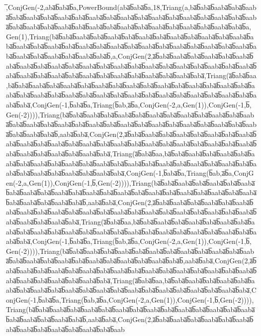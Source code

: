 ̅,ConjGen(-2,aba̅b̅aba̅b̅a,PowerBound(aba̅b̅aba̅b̅a,18,Triang(a,ba̅b̅aba̅b̅aaba̅b̅aba̅b̅aaba̅b̅aba̅b̅aaba̅b̅aba̅b̅aaba̅b̅aba̅b̅aaba̅b̅aba̅b̅aaba̅b̅aba̅b̅aaba̅b̅aba̅b̅aaba̅b̅aba̅b̅aaba̅b̅aba̅b̅aaba̅b̅aba̅b̅aaba̅b̅aba̅b̅aaba̅b̅aba̅b̅aaba̅b̅aba̅b̅aaba̅b̅aba̅b̅aaba̅b̅aba̅b̅aaba̅b̅aba̅b̅aaba̅b̅aba̅b̅a,Gen(1),Triang(ba̅b̅aba̅b̅aaba̅b̅aba̅b̅aaba̅b̅aba̅b̅aaba̅b̅aba̅b̅aaba̅b̅aba̅b̅aaba̅b̅aba̅b̅aaba̅b̅aba̅b̅aaba̅b̅aba̅b̅aaba̅b̅aba̅b̅aaba̅b̅aba̅b̅aaba̅b̅aba̅b̅aaba̅b̅aba̅b̅aaba̅b̅aba̅b̅aaba̅b̅aba̅b̅aaba̅b̅aba̅b̅aaba̅b̅aba̅b̅aaba̅b̅aba̅b̅aaba̅b̅aba̅b̅,a,ConjGen(2,a̅b̅aba̅b̅aaba̅b̅aba̅b̅aaba̅b̅aba̅b̅aaba̅b̅aba̅b̅aaba̅b̅aba̅b̅aaba̅b̅aba̅b̅aaba̅b̅aba̅b̅aaba̅b̅aba̅b̅aaba̅b̅aba̅b̅aaba̅b̅aba̅b̅aaba̅b̅aba̅b̅aaba̅b̅aba̅b̅aaba̅b̅aba̅b̅aaba̅b̅aba̅b̅aaba̅b̅aba̅b̅aaba̅b̅aba̅b̅aaba̅b̅aba̅b̅aaba̅b̅aba̅,Triang(a̅b̅aba̅b̅aa,ba̅b̅aba̅b̅aaba̅b̅aba̅b̅aaba̅b̅aba̅b̅aaba̅b̅aba̅b̅aaba̅b̅aba̅b̅aaba̅b̅aba̅b̅aaba̅b̅aba̅b̅aaba̅b̅aba̅b̅aaba̅b̅aba̅b̅aaba̅b̅aba̅b̅aaba̅b̅aba̅b̅aaba̅b̅aba̅b̅aaba̅b̅aba̅b̅aaba̅b̅aba̅b̅aaba̅b̅aba̅b̅aaba̅b̅aba̅b̅aaba̅b̅aba̅,ConjGen(-1,b̅aba̅b̅a,Triang(b̅ab,a̅b̅a,ConjGen(-2,a,Gen(1)),ConjGen(-1,b̅,Gen(-2)))),Triang(ba̅b̅aba̅b̅aaba̅b̅aba̅b̅aaba̅b̅aba̅b̅aaba̅b̅aba̅b̅aaba̅b̅aba̅b̅aaba̅b̅aba̅b̅aaba̅b̅aba̅b̅aaba̅b̅aba̅b̅aaba̅b̅aba̅b̅aaba̅b̅aba̅b̅aaba̅b̅aba̅b̅aaba̅b̅aba̅b̅aaba̅b̅aba̅b̅aaba̅b̅aba̅b̅aaba̅b̅aba̅b̅aaba̅b̅aba̅b̅,aaba̅b̅aba̅,ConjGen(2,a̅b̅aba̅b̅aaba̅b̅aba̅b̅aaba̅b̅aba̅b̅aaba̅b̅aba̅b̅aaba̅b̅aba̅b̅aaba̅b̅aba̅b̅aaba̅b̅aba̅b̅aaba̅b̅aba̅b̅aaba̅b̅aba̅b̅aaba̅b̅aba̅b̅aaba̅b̅aba̅b̅aaba̅b̅aba̅b̅aaba̅b̅aba̅b̅aaba̅b̅aba̅b̅aaba̅b̅aba̅b̅aaba̅b̅aba̅,Triang(a̅b̅aba̅b̅aa,ba̅b̅aba̅b̅aaba̅b̅aba̅b̅aaba̅b̅aba̅b̅aaba̅b̅aba̅b̅aaba̅b̅aba̅b̅aaba̅b̅aba̅b̅aaba̅b̅aba̅b̅aaba̅b̅aba̅b̅aaba̅b̅aba̅b̅aaba̅b̅aba̅b̅aaba̅b̅aba̅b̅aaba̅b̅aba̅b̅aaba̅b̅aba̅b̅aaba̅b̅aba̅b̅aaba̅b̅aba̅,ConjGen(-1,b̅aba̅b̅a,Triang(b̅ab,a̅b̅a,ConjGen(-2,a,Gen(1)),ConjGen(-1,b̅,Gen(-2)))),Triang(ba̅b̅aba̅b̅aaba̅b̅aba̅b̅aaba̅b̅aba̅b̅aaba̅b̅aba̅b̅aaba̅b̅aba̅b̅aaba̅b̅aba̅b̅aaba̅b̅aba̅b̅aaba̅b̅aba̅b̅aaba̅b̅aba̅b̅aaba̅b̅aba̅b̅aaba̅b̅aba̅b̅aaba̅b̅aba̅b̅aaba̅b̅aba̅b̅aaba̅b̅aba̅b̅,aaba̅b̅aba̅,ConjGen(2,a̅b̅aba̅b̅aaba̅b̅aba̅b̅aaba̅b̅aba̅b̅aaba̅b̅aba̅b̅aaba̅b̅aba̅b̅aaba̅b̅aba̅b̅aaba̅b̅aba̅b̅aaba̅b̅aba̅b̅aaba̅b̅aba̅b̅aaba̅b̅aba̅b̅aaba̅b̅aba̅b̅aaba̅b̅aba̅b̅aaba̅b̅aba̅b̅aaba̅b̅aba̅,Triang(a̅b̅aba̅b̅aa,ba̅b̅aba̅b̅aaba̅b̅aba̅b̅aaba̅b̅aba̅b̅aaba̅b̅aba̅b̅aaba̅b̅aba̅b̅aaba̅b̅aba̅b̅aaba̅b̅aba̅b̅aaba̅b̅aba̅b̅aaba̅b̅aba̅b̅aaba̅b̅aba̅b̅aaba̅b̅aba̅b̅aaba̅b̅aba̅b̅aaba̅b̅aba̅,ConjGen(-1,b̅aba̅b̅a,Triang(b̅ab,a̅b̅a,ConjGen(-2,a,Gen(1)),ConjGen(-1,b̅,Gen(-2)))),Triang(ba̅b̅aba̅b̅aaba̅b̅aba̅b̅aaba̅b̅aba̅b̅aaba̅b̅aba̅b̅aaba̅b̅aba̅b̅aaba̅b̅aba̅b̅aaba̅b̅aba̅b̅aaba̅b̅aba̅b̅aaba̅b̅aba̅b̅aaba̅b̅aba̅b̅aaba̅b̅aba̅b̅aaba̅b̅aba̅b̅,aaba̅b̅aba̅,ConjGen(2,a̅b̅aba̅b̅aaba̅b̅aba̅b̅aaba̅b̅aba̅b̅aaba̅b̅aba̅b̅aaba̅b̅aba̅b̅aaba̅b̅aba̅b̅aaba̅b̅aba̅b̅aaba̅b̅aba̅b̅aaba̅b̅aba̅b̅aaba̅b̅aba̅b̅aaba̅b̅aba̅b̅aaba̅b̅aba̅,Triang(a̅b̅aba̅b̅aa,ba̅b̅aba̅b̅aaba̅b̅aba̅b̅aaba̅b̅aba̅b̅aaba̅b̅aba̅b̅aaba̅b̅aba̅b̅aaba̅b̅aba̅b̅aaba̅b̅aba̅b̅aaba̅b̅aba̅b̅aaba̅b̅aba̅b̅aaba̅b̅aba̅b̅aaba̅b̅aba̅,ConjGen(-1,b̅aba̅b̅a,Triang(b̅ab,a̅b̅a,ConjGen(-2,a,Gen(1)),ConjGen(-1,b̅,Gen(-2)))),Triang(ba̅b̅aba̅b̅aaba̅b̅aba̅b̅aaba̅b̅aba̅b̅aaba̅b̅aba̅b̅aaba̅b̅aba̅b̅aaba̅b̅aba̅b̅aaba̅b̅aba̅b̅aaba̅b̅aba̅b̅aaba̅b̅aba̅b̅aaba̅b̅aba̅b̅,aaba̅b̅aba̅,ConjGen(2,a̅b̅aba̅b̅aaba̅b̅aba̅b̅aaba̅b̅aba̅b̅aaba̅b̅aba̅b̅aaba̅b̅aba̅b̅aaba̅b̅aba̅b̅aaba̅b̅aba̅b̅aab